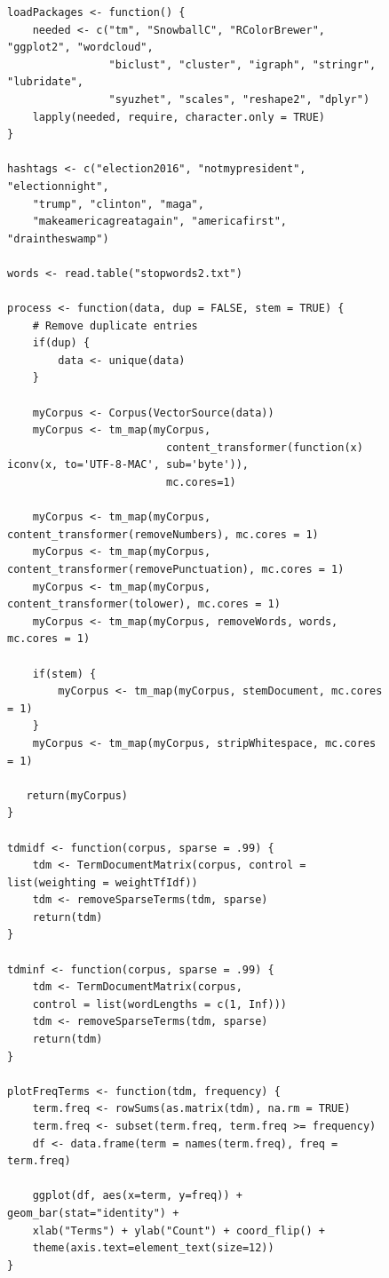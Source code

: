\documentclass[prodmode]{acmsmall} %
\begin{document}
\begin{figure}[!t]
    \begin{lstlisting}
loadPackages <- function() {
    needed <- c("tm", "SnowballC", "RColorBrewer", "ggplot2", "wordcloud",
                "biclust", "cluster", "igraph", "stringr", "lubridate",
				"syuzhet", "scales", "reshape2", "dplyr") 
    lapply(needed, require, character.only = TRUE)
}

hashtags <- c("election2016", "notmypresident", "electionnight",
    "trump", "clinton", "maga",
    "makeamericagreatagain", "americafirst", "draintheswamp")
	
words <- read.table("stopwords2.txt") 

process <- function(data, dup = FALSE, stem = TRUE) {
	# Remove duplicate entries
	if(dup) {
		data <- unique(data)
	}
	
    myCorpus <- Corpus(VectorSource(data))
	myCorpus <- tm_map(myCorpus,
	                     content_transformer(function(x) iconv(x, to='UTF-8-MAC', sub='byte')),
	                     mc.cores=1)
	
	myCorpus <- tm_map(myCorpus, content_transformer(removeNumbers), mc.cores = 1)
	myCorpus <- tm_map(myCorpus, content_transformer(removePunctuation), mc.cores = 1)
    myCorpus <- tm_map(myCorpus, content_transformer(tolower), mc.cores = 1)
	myCorpus <- tm_map(myCorpus, removeWords, words, mc.cores = 1)
	
	if(stem) {
		myCorpus <- tm_map(myCorpus, stemDocument, mc.cores = 1)
	}
    myCorpus <- tm_map(myCorpus, stripWhitespace, mc.cores = 1)
	
   return(myCorpus) 
}

tdmidf <- function(corpus, sparse = .99) {
    tdm <- TermDocumentMatrix(corpus, control = list(weighting = weightTfIdf))
	tdm <- removeSparseTerms(tdm, sparse)
    return(tdm)
}

tdminf <- function(corpus, sparse = .99) {
    tdm <- TermDocumentMatrix(corpus,
    control = list(wordLengths = c(1, Inf)))
	tdm <- removeSparseTerms(tdm, sparse)
    return(tdm)
}

plotFreqTerms <- function(tdm, frequency) {
    term.freq <- rowSums(as.matrix(tdm), na.rm = TRUE)
    term.freq <- subset(term.freq, term.freq >= frequency)
    df <- data.frame(term = names(term.freq), freq = term.freq)

    ggplot(df, aes(x=term, y=freq)) + geom_bar(stat="identity") +
    xlab("Terms") + ylab("Count") + coord_flip() +
    theme(axis.text=element_text(size=12))
}

\end{lstlisting}
  \end{figure}
\end{document}
